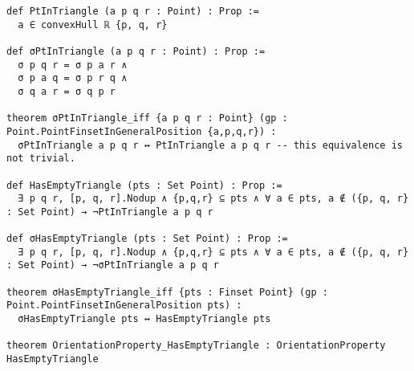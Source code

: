 \begin{lstlisting}
def PtInTriangle (a p q r : Point) : Prop :=
  a ∈ convexHull ℝ {p, q, r}

def σPtInTriangle (a p q r : Point) : Prop :=
  σ p q r = σ p a r ∧
  σ p a q = σ p r q ∧
  σ q a r = σ q p r

theorem σPtInTriangle_iff {a p q r : Point} (gp : Point.PointFinsetInGeneralPosition {a,p,q,r}) :
  σPtInTriangle a p q r ↔ PtInTriangle a p q r -- this equivalence is not trivial.

def HasEmptyTriangle (pts : Set Point) : Prop :=
  ∃ p q r, [p, q, r].Nodup ∧ {p,q,r} ⊆ pts ∧ ∀ a ∈ pts, a ∉ ({p, q, r} : Set Point) → ¬PtInTriangle a p q r

def σHasEmptyTriangle (pts : Set Point) : Prop :=
  ∃ p q r, [p, q, r].Nodup ∧ {p,q,r} ⊆ pts ∧ ∀ a ∈ pts, a ∉ ({p, q, r} : Set Point) → ¬σPtInTriangle a p q r

theorem σHasEmptyTriangle_iff {pts : Finset Point} (gp : Point.PointFinsetInGeneralPosition pts) :
  σHasEmptyTriangle pts ↔ HasEmptyTriangle pts

theorem OrientationProperty_HasEmptyTriangle : OrientationProperty HasEmptyTriangle 
\end{lstlisting}

